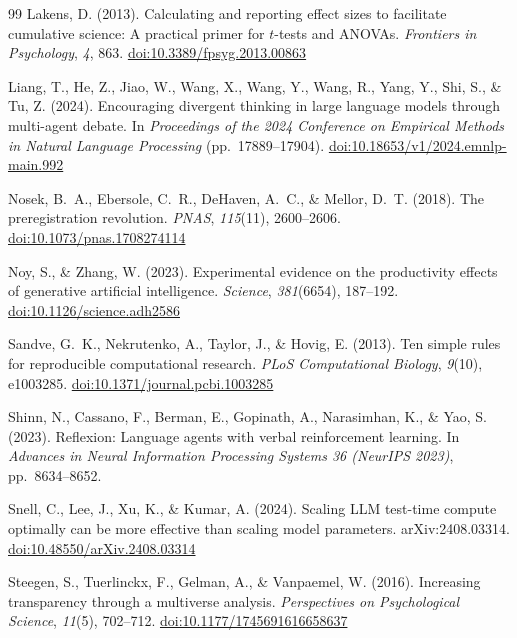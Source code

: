 \documentclass[12pt,a4paper]{article}
\begin{document}
\begin{thebibliography}{99}
Lakens, D. (2013).
Calculating and reporting effect sizes to facilitate cumulative science: A
  practical primer for $t$-tests and ANOVAs.
\textit{Frontiers in Psychology}, \textit{4}, 863.
\href{https://doi.org/10.3389/fpsyg.2013.00863}{doi:10.3389/fpsyg.2013.00863}

Liang, T., He, Z., Jiao, W., Wang, X., Wang, Y., Wang, R., Yang, Y., Shi, S.,
  \& Tu, Z. (2024).
Encouraging divergent thinking in large language models through multi-agent
  debate.
In \textit{Proceedings of the 2024 Conference on Empirical Methods in Natural
  Language Processing} (pp.~17889--17904).
\href{https://doi.org/10.18653/v1/2024.emnlp-main.992}{doi:10.18653/v1/2024.emnlp-main.992}

Nosek, B.~A., Ebersole, C.~R., DeHaven, A.~C., \& Mellor, D.~T. (2018).
The preregistration revolution.
\textit{PNAS}, \textit{115}(11), 2600--2606.
\href{https://doi.org/10.1073/pnas.1708274114}{doi:10.1073/pnas.1708274114}

Noy, S., \& Zhang, W. (2023).
Experimental evidence on the productivity effects of generative artificial
  intelligence.
\textit{Science}, \textit{381}(6654), 187--192.
\href{https://doi.org/10.1126/science.adh2586}{doi:10.1126/science.adh2586}

Sandve, G.~K., Nekrutenko, A., Taylor, J., \& Hovig, E. (2013).
Ten simple rules for reproducible computational research.
\textit{PLoS Computational Biology}, \textit{9}(10), e1003285.
\href{https://doi.org/10.1371/journal.pcbi.1003285}{doi:10.1371/journal.pcbi.1003285}

Shinn, N., Cassano, F., Berman, E., Gopinath, A., Narasimhan, K., \& Yao, S.
  (2023).
Reflexion: Language agents with verbal reinforcement learning.
In \textit{Advances in Neural Information Processing Systems 36 (NeurIPS 2023)},
  pp.~8634--8652.

Snell, C., Lee, J., Xu, K., \& Kumar, A. (2024).
Scaling LLM test-time compute optimally can be more effective than scaling model
  parameters.
arXiv:2408.03314.
\href{https://doi.org/10.48550/arXiv.2408.03314}{doi:10.48550/arXiv.2408.03314}

Steegen, S., Tuerlinckx, F., Gelman, A., \& Vanpaemel, W. (2016).
Increasing transparency through a multiverse analysis.
\textit{Perspectives on Psychological Science}, \textit{11}(5), 702--712.
\href{https://doi.org/10.1177/1745691616658637}{doi:10.1177/1745691616658637}


\end{thebibliography}
\end{document}
